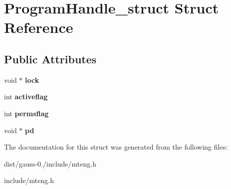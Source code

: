 \hypertarget{struct_program_handle__struct}{\section{Program\-Handle\-\_\-struct Struct Reference}
\label{struct_program_handle__struct}
}
\subsection*{Public Attributes}
\begin{DoxyCompactItemize}
\item 
\hypertarget{struct_program_handle__struct_a9ca362ca435c9cf32ccbdcb6ec85c6cf}{void $\ast$ {\bfseries lock}}\label{struct_program_handle__struct_a9ca362ca435c9cf32ccbdcb6ec85c6cf}

\item 
\hypertarget{struct_program_handle__struct_ad0a7b49b32eeac8e72321ead8fa06edc}{int {\bfseries activeflag}}\label{struct_program_handle__struct_ad0a7b49b32eeac8e72321ead8fa06edc}

\item 
\hypertarget{struct_program_handle__struct_a57412296467749c7b95b5d9011f64a26}{int {\bfseries permsflag}}\label{struct_program_handle__struct_a57412296467749c7b95b5d9011f64a26}

\item 
\hypertarget{struct_program_handle__struct_a088f6e50750ce6130edb89c4602cddb5}{void $\ast$ {\bfseries pd}}\label{struct_program_handle__struct_a088f6e50750ce6130edb89c4602cddb5}

\end{DoxyCompactItemize}


The documentation for this struct was generated from the following files\-:\begin{DoxyCompactItemize}
\item 
dist/gauss-\/0./include/mteng.\-h\item 
include/mteng.\-h\end{DoxyCompactItemize}
